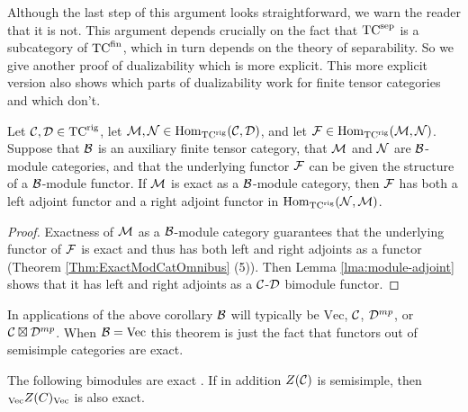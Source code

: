 \documentclass{amsart}
\begin{document}
\begin{warning}
Although the last step of this argument looks straightforward, we warn the reader that it is not.  This argument depends crucially on the fact that $\TCsep$ is a subcategory of $\TCfin$, which in turn depends on the theory of separability.  So we give another proof of dualizability which is more explicit.  This more explicit version also shows which parts of dualizability work for finite tensor categories and which don't.
\end{warning}



\begin{lemma} \label{lma:2morAdjunction}
Let $\cC, \cD \in \TCrig$, let $\cM, \cN \in \Hom_\TCrig(\cC,\cD)$, and let $\cF \in \Hom_{\TCrig}(\cM,\cN)$.  Suppose that $\cB$ is an auxiliary finite tensor category, that $\cM$ and $\cN$ are $\cB$-module categories, and that the underlying functor $\cF$ can be given the structure of a $\cB$-module functor.  If $\cM$ is exact as a $\cB$-module category, then $\cF$ has both a left adjoint functor and a right adjoint functor in $\Hom_{\TCrig}(\cN,\cM)$.  
\end{lemma}
\begin{proof}
Exactness of $\cM$ as a $\cB$-module category guarantees that the underlying functor of $\cF$ is exact and thus has both left and right adjoints as a functor (Theorem \ref{Thm:ExactModCatOmnibus} (5)).  Then Lemma \ref{lma:module-adjoint} shows that it has left and right adjoints as a $\cC$-$\cD$ bimodule functor.
\end{proof}

\begin{remark}
In applications of the above corollary $\cB$ will typically be $\mathrm{Vec}$, $\cC$, $\cD^{mp}$, or $\cC \boxtimes \cD^{mp}$.  When $\cB = \Vec$ this theorem is just the fact that functors out of semisimple categories are exact.
\end{remark}


\begin{lemma}
The following bimodules are exact .  If in addition $Z(\cC)$ is semisimple, then ${}_\Vec Z(C)_\Vec$ is also exact.
\end{lemma}
\end{document}

